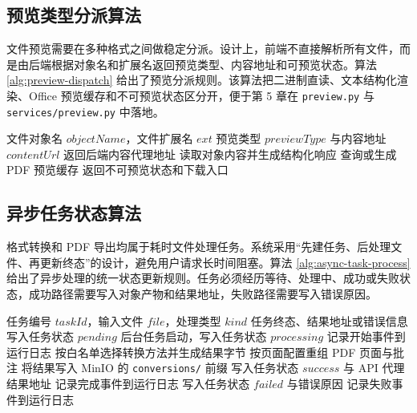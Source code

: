 \subsection{预览类型分派算法}

文件预览需要在多种格式之间做稳定分派。设计上，前端不直接解析所有文件，而是由后端根据对象名和扩展名返回预览类型、内容地址和可预览状态。算法 \ref{alg:preview-dispatch} 给出了预览分派规则。该算法把二进制直读、文本结构化渲染、Office 预览缓存和不可预览状态区分开，便于第 5 章在 \texttt{preview.py} 与 \texttt{services/preview.py} 中落地。

\begin{algorithm}[H]
  \caption{文件预览类型分派算法}
  \label{alg:preview-dispatch}
  \renewcommand{\algorithmicrequire}{\textbf{输入：}}
  \renewcommand{\algorithmicensure}{\textbf{输出：}}
  \begin{algorithmic}[1]
    \Require 文件对象名 $objectName$，文件扩展名 $ext$
    \Ensure 预览类型 $previewType$ 与内容地址 $contentUrl$
      \State 返回后端内容代理地址
      \State 读取对象内容并生成结构化响应
      \State 查询或生成 PDF 预览缓存
    \Else
      \State 返回不可预览状态和下载入口
    \EndIf
  \end{algorithmic}
\end{algorithm}

\subsection{异步任务状态算法}

格式转换和 PDF 导出均属于耗时文件处理任务。系统采用“先建任务、后处理文件、再更新终态”的设计，避免用户请求长时间阻塞。算法 \ref{alg:async-task-process} 给出了异步处理的统一状态更新规则。任务必须经历等待、处理中、成功或失败状态，成功路径需要写入对象产物和结果地址，失败路径需要写入错误原因。

\begin{algorithm}[H]
  \caption{异步文件处理任务状态更新算法}
  \label{alg:async-task-process}
  \renewcommand{\algorithmicrequire}{\textbf{输入：}}
  \renewcommand{\algorithmicensure}{\textbf{输出：}}
  \begin{algorithmic}[1]
    \Require 任务编号 $taskId$，输入文件 $file$，处理类型 $kind$
    \Ensure 任务终态、结果地址或错误信息
    \State 写入任务状态 $pending$
    \State 后台任务启动，写入任务状态 $processing$
    \State 记录开始事件到运行日志
      \State 按白名单选择转换方法并生成结果字节
    \Else
      \State 按页面配置重组 PDF 页面与批注
    \EndIf
      \State 将结果写入 MinIO 的 \texttt{conversions/} 前缀
      \State 写入任务状态 $success$ 与 API 代理结果地址
      \State 记录完成事件到运行日志
    \Else
      \State 写入任务状态 $failed$ 与错误原因
      \State 记录失败事件到运行日志
    \EndIf
  \end{algorithmic}
\end{algorithm}

